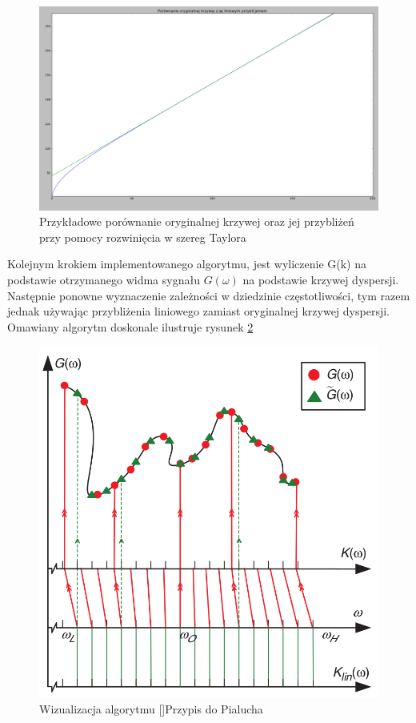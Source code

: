 \begin{figure}[h]
\centering
\includegraphics[width=14cm]{Zdjecia/4/krzywa_moja}
\caption{Przykładowe porównanie oryginalnej krzywej oraz jej przybliżeń przy pomocy rozwinięcia w szereg Taylora}
\label{fig:krzywa_moja}
\end{figure}

Kolejnym krokiem implementowanego algorytmu, jest wyliczenie G(k) na podstawie otrzymanego widma sygnału $G(\omega)$ na podstawie krzywej dyspersji. Następnie ponowne wyznaczenie zależności w dziedzinie częstotliwości, tym razem jednak używając przybliżenia liniowego zamiast oryginalnej krzywej dyspersji. Omawiany algorytm doskonale ilustruje rysunek \ref{fig:algo_Taylora}

\begin{figure}[h]
\centering
\includegraphics[width=13cm]{Zdjecia/4/algo_Taylora}
\caption{Wizualizacja algorytmu []Przypis do Pialucha}
\label{fig:algo_Taylora}
\end{figure}

